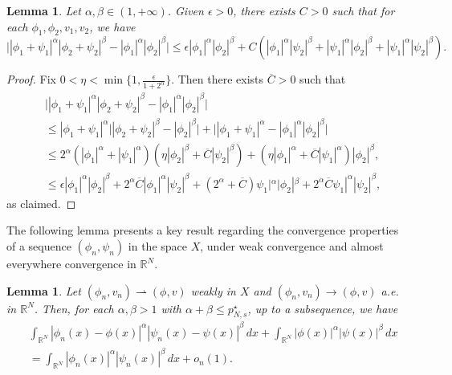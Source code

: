 \documentclass[10pt,a4paper]{amsart}
\numberwithin{equation}{section}
\newtheorem{lemma}[theo]{Lemma}
\begin{document}
\begin{lemma}\label{l2} 
Let $\alpha,\beta\in (1,+\infty)$. Given $\epsilon>0$, there exists $C>0$ such that 
for each $\phi_1,\phi_2,v_1,v_2$, we have
\[
\Big||\phi_1+\psi_1|^\alpha|\phi_2+\psi_2|^\beta
-|\phi_1|^\alpha|\phi_2|^\beta\Big|
\leq \epsilon |\phi_1|^\alpha|\phi_2|^\beta+C(|\phi_1|^\alpha|\psi_2|^\beta
+|\psi_1|^\alpha|\phi_2|^\beta+|\psi_1|^\alpha|\psi_2|^\beta).
\]
\end{lemma}

\begin{proof}
Fix $0<\eta<\min\lbrace 1,\frac{\epsilon}{1+2^\alpha}  \rbrace$. 
Then there exists $\overline{C}>0$ such that
\begin{align*}
&\Big||\phi_1+\psi_1|^\alpha|\phi_2+\psi_2|^\beta-|\phi_1|^\alpha|\phi_2|^\beta\Big|\\
&\leq|\phi_1+\psi_1|^\alpha \Big||\phi_2+\psi_2|^\beta-|\phi_2|^\beta\Big|
 +\Big||\phi_1+\psi_1|^\alpha-|\phi_1|^\alpha|\phi_2|^\beta\Big|\\
&\leq 2^\alpha(|\phi_1|^\alpha+|\psi_1|^\alpha)(\eta|\phi_2|^\beta
 +\overline{C}|\psi_2|^\beta)
 +(\eta|\phi_1|^\alpha+\overline{C}|\psi_1|^\alpha)|\phi_2|^\beta,\\
&\leq \epsilon |\phi_1|^\alpha|\phi_2|^\beta+2^\alpha\overline{C}|
 \phi_1|^\alpha|\psi_2|^\beta
 +(2^\alpha+\overline{C})\psi_1|^\alpha|\phi_2|^\beta+2^\alpha\overline{C}\psi_1|^\alpha|\psi_2|^\beta,
\end{align*}
as claimed.
\end{proof}

The following lemma presents a key result regarding the convergence properties of a 
sequence $(\phi_n,\psi_n)$ in the space $X$, under weak convergence and almost 
everywhere convergence in $\mathbb{R}^N$.

\begin{lemma}\label{l3} 
Let $(\phi_n,v_n)\rightharpoonup (\phi,v)$ weakly in $X$ and 
$(\phi_n,v_n)\to (\phi,v)$ a.e. in $\mathbb{R}^N$. Then, for each $\alpha,\beta>1$
with $\alpha+\beta\leq p^\star_{N,s}$, up to a subsequence, we have
\begin{align*}
&\int_{\mathbb{R}^N}|\phi_n(x)-\phi(x)|^\alpha|\psi_n(x)-\psi(x)|^\beta\,dx
 +\int_{\mathbb{R}^N} |\phi(x)|^\alpha|\psi(x)|^\beta\,dx \\
&=\int_{\mathbb{R}^N}|\phi_n(x)|^\alpha|\psi_n(x)|^\beta\,dx+o_n(1).
\end{align*}
\end{lemma}
\end{document}
